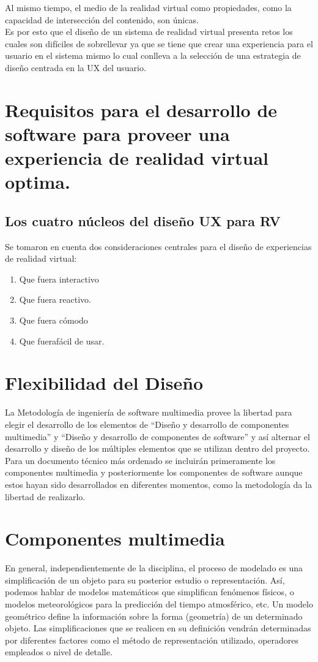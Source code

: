 Al mismo tiempo, el medio de la realidad virtual como propiedades, como la capacidad de intersección del contenido, son únicas.\\

Es por esto que el diseño de un sistema de realidad virtual presenta retos los cuales son difíciles de sobrellevar ya que se tiene que crear una experiencia para el usuario en el sistema mismo lo cual conlleva a la selección de una estrategia de diseño centrada en la UX del usuario.\\

\section{Requisitos para el desarrollo de software para proveer una experiencia de realidad virtual optima.}
\subsection{Los cuatro núcleos del diseño UX para RV}
Se tomaron en cuenta dos consideraciones centrales para el diseño de experiencias de realidad virtual:
\begin{enumerate}
\item Que fuera interactivo 
\item Que fuera reactivo.
\item Que fuera cómodo
\item Que fuerafácil de usar.
\end{enumerate}

\section{Flexibilidad del Diseño}
La Metodología de ingeniería de software multimedia provee la libertad para elegir el desarrollo de los elementos de “Diseño y desarrollo de componentes multimedia” y “Diseño y desarrollo de componentes de software” y así alternar el desarrollo y diseño de los múltiples elementos que se utilizan dentro del proyecto. Para un documento técnico más ordenado se incluirán primeramente los componentes multimedia y posteriormente los componentes de software aunque estos hayan sido desarrollados en diferentes momentos, como la metodología da la libertad de realizarlo.\\

\section{Componentes multimedia}
En general, independientemente de la disciplina, el proceso de modelado es una simplificación de un objeto para su posterior estudio o representación. Así, podemos hablar de modelos matemáticos que simplifican fenómenos físicos, o modelos meteorológicos para la predicción del tiempo atmosférico, etc. Un modelo geométrico define la información sobre la forma (geometría) de un determinado objeto. Las simplificaciones que se realicen en su definición vendrán determinadas por diferentes factores como el método de representación utilizado, operadores empleados o nivel de detalle.\cite{web13} \\

